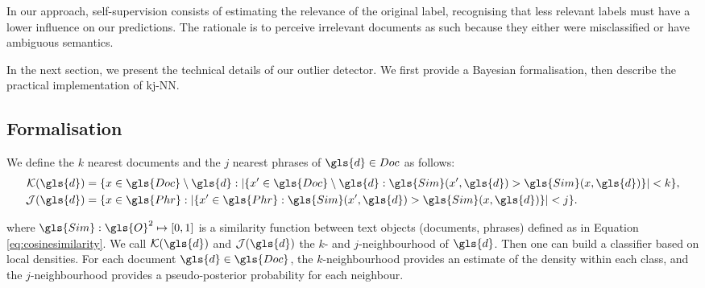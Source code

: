 In our approach, self-supervision consists of estimating the relevance of the original label, recognising that less relevant labels must have a lower influence on our predictions. 
The rationale is to perceive irrelevant documents as such because they either were misclassified or have ambiguous semantics. 

In the next section, we present the technical details of our outlier detector. We first provide a Bayesian formalisation, then describe the practical implementation of \gls{kj-NN}. 

\subsection{Formalisation}

We define the $k$ nearest documents and the $j$ nearest phrases of $\gls{d} \in Doc$  as follows: 
\begin{align*}
\mathcal{K}(\gls{d}) &= \{x \in \gls{Doc} \setminus \gls{d} : |\{x' \in \gls{Doc} \setminus \gls{d} : \gls{Sim}(x',\gls{d}) > \gls{Sim}(x, \gls{d})\}| < k \},  \\
\mathcal{J}(\gls{d}) &= \{x \in \gls{Phr}: |\{x' \in \gls{Phr}: \gls{Sim}(x',\gls{d}) > \gls{Sim}(x, \gls{d})\}| < j \}.
\end{align*} 

where $\gls{Sim}: \gls{O}^2 \mapsto [0,1]$ is a similarity function between text objects (documents, phrases) defined as in Equation \ref{eq:cosinesimilarity}. 
We call $\mathcal{K}(\gls{d})$ and $\mathcal{J}(\gls{d})$ the $k$- and $j$-neighbourhood of $\gls{d}$. Then one can build a classifier based on local densities. For each document $\gls{d} \in \gls{Doc}$, the $k$-neighbourhood provides an estimate of the density within each class, 
and the $j$-neighbourhood provides a pseudo-posterior probability for each neighbour.

